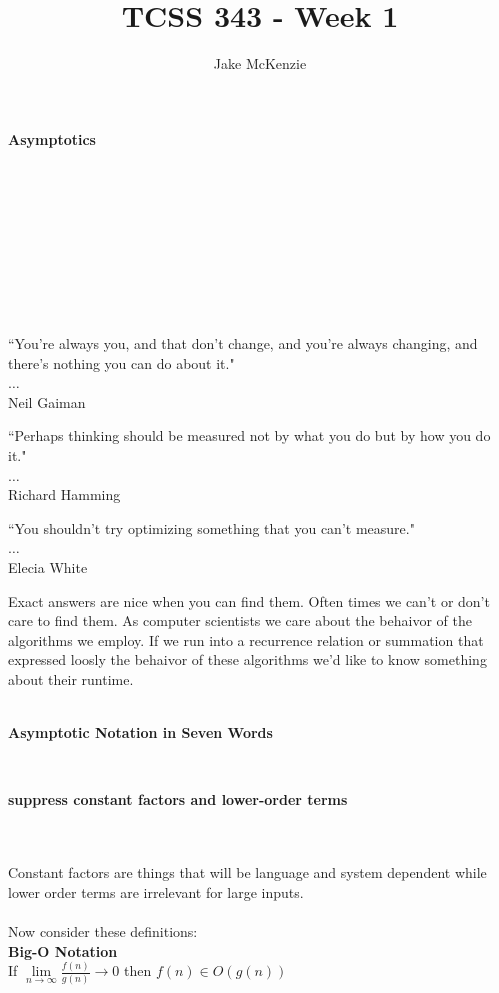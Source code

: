 \documentclass[12pt]{article}
\begin{document}
\title{TCSS 343 - Week 1}
\author{Jake McKenzie}
\maketitle
\noindent\centerline{\textbf{Asymptotics}}\\\\\\\\\\\\\\\\
\begin{center}
    ``You're always you, and that don't change, and you're always changing, and there's nothing you can do about it." \\$\dots$\\ Neil Gaiman
\end{center}
\begin{center}
    ``Perhaps thinking should be measured not by what you do but by how you do it." \\$\dots$\\ Richard Hamming
\end{center}
\begin{center}
    ``You shouldn't try optimizing something that you can't measure." \\$\dots$\\ Elecia White
\end{center}
    \newpage
Exact answers are nice when you can find them. Often times we can't or don't care to find them. As computer scientists we care about the behaivor of the algorithms we employ. If we run into a recurrence relation or summation that expressed loosly the behaivor of these algorithms we'd like to know something about their runtime.\\\\
\centerline{\textbf{Asymptotic Notation in Seven Words}}\\
\centerline{\textbf{suppress constant factors and lower-order terms}}\\\\
Constant factors are things that will be language and system dependent while lower order terms are irrelevant for large inputs.\\\\
Now consider these definitions:\\
\textbf{Big-O Notation}\\
If $\lim\limits_{n\to\infty}{\frac{f(n)}{g(n)}}\to0$ then $f(n) \in O(g(n))$\\\\
\end{document}
